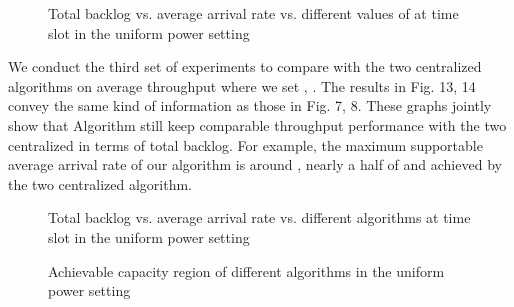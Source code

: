 \documentclass[journal]{IEEEtran}
\begin{document}
\begin{figure}[htpb]
    \centering
  \hspace{0cm}
   \caption{{\small{Total backlog vs. average arrival rate vs. different values of  at time slot  in the uniform power setting}}}
\end{figure}

We  conduct the third set of experiments to compare with the two centralized algorithms on average throughput where we set , . The results in Fig. 13, 14  convey the same kind of information as those in Fig. 7, 8. These graphs jointly show that Algorithm  still keep comparable throughput performance with the two centralized in terms of total backlog. For example, the maximum supportable average arrival rate of our algorithm is around , nearly a half of  and  achieved by the two centralized algorithm.

\begin{figure}[htpb]
    \centering
  \hspace{0cm}
     \caption{{\small{Total backlog vs. average arrival rate  vs. different algorithms at time slot  in the uniform power setting} }}
\end{figure}

\begin{comment}
\begin{figure*}[htpb]
    \centering
    \subfigure[Average arrival rate =  ]{
        \texttt{[image: up-rate16.eps]}}
  \hspace{0cm}
\subfigure[Average arrival rate = ]{
        \texttt{[image: up-rate26.eps]}}
  \hspace{0cm}
\subfigure[Average arrival rate =]{
        \texttt{[image: up-rate32.eps]}}
   \caption{{\small{Total backlog vs. time slot vs. different algorithms at different average arrival rate in the uniform power setting }}}
   \vspace*{-1\baselineskip}
\end{figure*}
\end{comment}
\begin{figure*}[htpb]
    \centering
  \hspace{0cm}
  \hspace{0cm}
   \caption{{\small{Achievable capacity region of different algorithms in the uniform power setting}}}
   \vspace*{-1.0\baselineskip}
\end{figure*}
\end{document}

